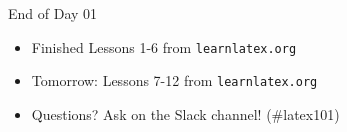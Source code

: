 \documentclass{beamer}
\begin{document}
{  %





\begin{frame}{End of Day 01}
  \begin{itemize}
    \item Finished Lessons 1-6 from \texttt{learnlatex.org}
    \item Tomorrow: Lessons 7-12 from \texttt{learnlatex.org}
    \item Questions? Ask on the Slack channel! (\#latex101)
  \end{itemize}
\end{frame}

} %
\end{document}
